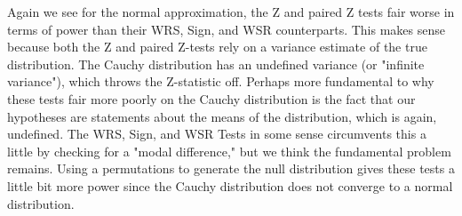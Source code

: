 \documentclass[11pt]{article}
\begin{document}
Again we see for the normal approximation, the Z and paired Z tests fair worse in terms of power than their WRS, Sign, and WSR counterparts.  This makes sense because both the Z and paired Z-tests rely on a variance estimate of the true distribution.  The Cauchy distribution has an undefined variance (or "infinite variance"), which throws the Z-statistic off.  Perhaps more fundamental to why these tests fair more poorly on the Cauchy distribution is the fact that our hypotheses are statements about the means of the distribution, which is again, undefined.  The WRS, Sign, and WSR Tests in some sense circumvents this a little by checking for a "modal difference," but we think the fundamental problem remains.  Using a permutations to generate the null distribution gives these tests a little bit more power since the Cauchy distribution does not converge to a normal distribution.
\end{document}
